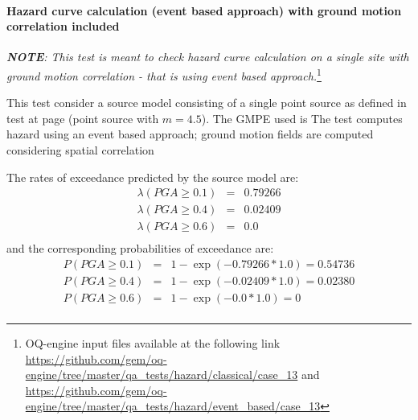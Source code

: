 \paragraph{Hazard curve calculation (event based approach) with ground
motion correlation included} 
%
\textit{\textbf{NOTE}: This test is meant to check hazard curve calculation on a
single site with ground motion correlation - that is using event based
approach.}\footnote{
OQ-engine input files available at the following link
\url{https://github.com/gem/oq-engine/tree/master/qa_tests/hazard/classical/case_13} 
and 
\url{https://github.com/gem/oq-engine/tree/master/qa_tests/hazard/event_based/case_13} 
}

This test consider a source model consisting of a single point source as 
defined in test at page \pageref{sec:test12} (point source with $m = 4.5$).
The GMPE used is \textcite{boore2008}
%
The test computes hazard using an event based approach; ground motion fields
are computed considering spatial correlation \parencite{jayaram2009}

The rates of exceedance predicted by the source model are:
\begin{eqnarray}
\lambda(PGA \geq 0.1) & = &  0.79266 \nonumber \\
\lambda(PGA \geq 0.4) & = &  0.02409 \nonumber \\
\lambda(PGA \geq 0.6) & = & 0.0 \nonumber \\
\end{eqnarray}
and the corresponding probabilities of exceedance are:
\begin{eqnarray}
P(PGA \geq 0.1) & = & 1 - \exp(- 0.79266 * 1.0) = 0.54736\nonumber \\
P(PGA \geq 0.4) & = & 1 - \exp(- 0.02409 * 1.0) =  0.02380\nonumber \\
P(PGA \geq 0.6) & = & 1 - \exp(- 0.0 * 1.0) = 0 \nonumber \\
\end{eqnarray}



